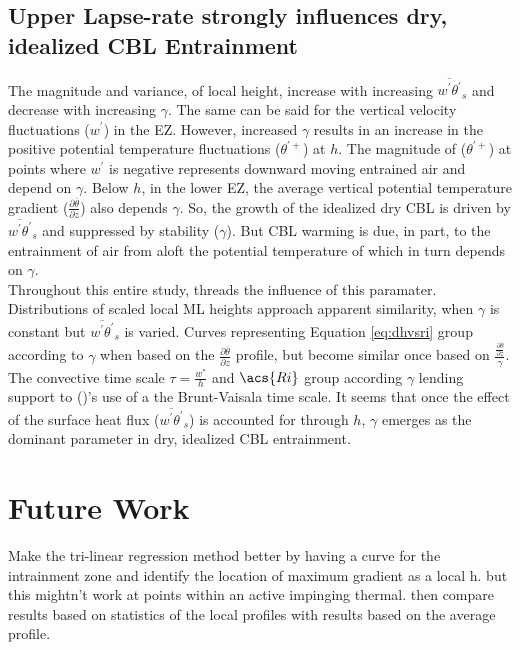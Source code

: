 \subsection{Upper Lapse-rate strongly influences dry, idealized \acs{CBL} Entrainment}

The magnitude and variance, of local height, increase with increasing $\overline{w^{'}\theta^{'}}_{s}$ and decrease with increasing $\gamma$.  The same can be said for the vertical velocity fluctuations ($w^{'}$) in the \acs{EZ}.  However, increased $\gamma$ results in an increase in the positive potential temperature fluctuations ($\theta^{'+}$) at $h$. The magnitude of ($\theta^{'+}$) at points where $w^{'}$ is negative represents downward moving entrained air and depend on $\gamma$.  Below $h$, in the lower \acs{EZ}, the average vertical potential temperature gradient ($\frac{\partial \overline{\theta}}{\partial z}$) also depends $\gamma$. So, the growth of the idealized dry \acs{CBL} is driven by $\overline{w^{'}\theta^{'}}_{s}$ and suppressed by stability ($\gamma$). But \acs{CBL} warming is due, in part, to the entrainment of air from aloft the potential temperature of which in turn depends on $\gamma$.\\

Throughout this entire study, threads the influence of this paramater.  Distributions of scaled local \acs{ML} heights approach apparent similarity, when $\gamma$ is constant but $\overline{w^{'}\theta^{'}}_{s}$ is varied.  Curves representing Equation \ref{eq:dhvsri} group according to $\gamma$ when based on the $\frac{\partial \overline{\theta}}{\partial z}$ profile, but become similar once based on $\frac{\frac{\partial \overline{\theta}}{\partial z}}{\gamma}$.  The convective time scale $\tau = \frac{w^{*}}{h}$ and $\acs{Ri}$ group according $\gamma$ lending support to \citeauthor{FedConzMir04} (\citeyear{FedConzMir04})'s use of a the Brunt-Vaisala time scale.  It seems that once the effect of the surface heat flux ($\overline{w^{'}\theta^{'}}_{s}$) is accounted for through $h$, $\gamma$ emerges as the dominant parameter in dry, idealized \acs{CBL} entrainment.\\ 

\section{Future Work}

Make the tri-linear regression method better by having a curve for the intrainment zone and identify the location of maximum gradient as a local h.  but this mightn't work at points within an active impinging thermal.  then compare results based on statistics of the local profiles with results based on the average profile.\\

